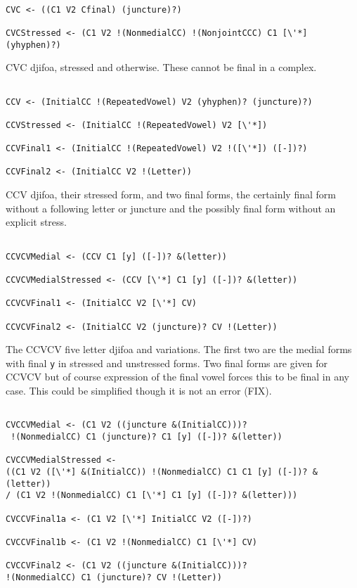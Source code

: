 \documentclass[12pt]{article}
\begin{document}
\begin{verbatim}

CVC <- ((C1 V2 Cfinal) (juncture)?)

CVCStressed <- (C1 V2 !(NonmedialCC) !(NonjointCCC) C1 [\'*] (yhyphen)?)

\end{verbatim}

CVC djifoa, stressed and otherwise.  These cannot be final in a complex.

\begin{verbatim}

CCV <- (InitialCC !(RepeatedVowel) V2 (yhyphen)? (juncture)?)

CCVStressed <- (InitialCC !(RepeatedVowel) V2 [\'*])

CCVFinal1 <- (InitialCC !(RepeatedVowel) V2 !([\'*]) ([-])?)

CCVFinal2 <- (InitialCC V2 !(Letter))

\end{verbatim}

CCV djifoa, their stressed form, and two final forms, the certainly final form without a following
letter or juncture and the possibly final form without an explicit stress.

\begin{verbatim}

CCVCVMedial <- (CCV C1 [y] ([-])? &(letter))

CCVCVMedialStressed <- (CCV [\'*] C1 [y] ([-])? &(letter))

CCVCVFinal1 <- (InitialCC V2 [\'*] CV)

CCVCVFinal2 <- (InitialCC V2 (juncture)? CV !(Letter))

\end{verbatim}

The CCVCV five letter djifoa and variations.  The first two are the medial forms with final {\tt y}
in stressed and unstressed forms.  Two final forms are given for CCVCV but of course expression of the final
vowel forces this to be final in any case.  This could be simplified though it is not an error (FIX).

\begin{verbatim}

CVCCVMedial <- (C1 V2 ((juncture &(InitialCC)))?
 !(NonmedialCC) C1 (juncture)? C1 [y] ([-])? &(letter))

CVCCVMedialStressed <- 
((C1 V2 ([\'*] &(InitialCC)) !(NonmedialCC) C1 C1 [y] ([-])? &(letter)) 
/ (C1 V2 !(NonmedialCC) C1 [\'*] C1 [y] ([-])? &(letter)))

CVCCVFinal1a <- (C1 V2 [\'*] InitialCC V2 ([-])?)

CVCCVFinal1b <- (C1 V2 !(NonmedialCC) C1 [\'*] CV)

CVCCVFinal2 <- (C1 V2 ((juncture &(InitialCC)))? 
!(NonmedialCC) C1 (juncture)? CV !(Letter))

\end{verbatim}
\end{document}
